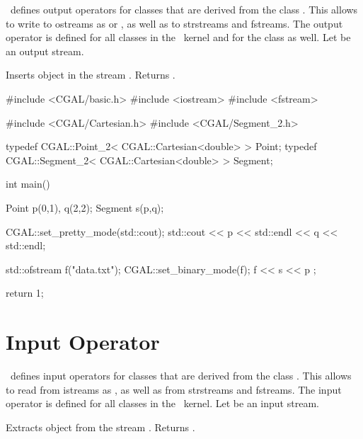 \cgal\  defines output operators for classes that are derived
from the class . This allows to write to ostreams
as  or , as well as to strstreams
and fstreams. 
The output operator is defined for all classes in the \cgal\ kernel and for the class  as well.
Let   be an output stream.

{Inserts object  in the stream . Returns .}


\ccExample

\begin{cprog}

#include <CGAL/basic.h>
#include <iostream>
#include <fstream>

#include <CGAL/Cartesian.h>
#include <CGAL/Segment_2.h>

typedef CGAL::Point_2< CGAL::Cartesian<double> >     Point;
typedef CGAL::Segment_2< CGAL::Cartesian<double> >   Segment;

int main()
{
    Point p(0,1), q(2,2);
    Segment s(p,q);

    CGAL::set_pretty_mode(std::cout);
    std::cout << p << std::endl << q  << std::endl;

    std::ofstream f("data.txt");
    CGAL::set_binary_mode(f);
    f << s << p ;

    return 1;
}
\end{cprog} 


\section{Input Operator}


\cgal\  defines input operators for classes that are derived
from the class . This allows to read from istreams
as , as well as from strstreams and fstreams.
The input operator is defined for all classes in the \cgal\ kernel.
Let  be an input stream.

   {Extracts object  from the stream . Returns .} 


\ccExample

